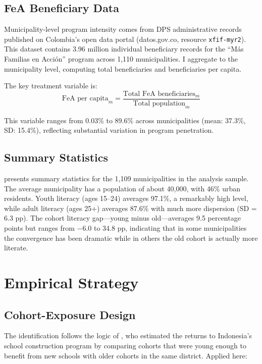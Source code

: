 \documentclass[12pt]{article}
\begin{document}
\subsection{FeA Beneficiary Data}

Municipality-level program intensity comes from DPS administrative records published on Colombia's open data portal (datos.gov.co, resource \texttt{xfif-myr2}). This dataset contains 3.96 million individual beneficiary records for the ``M\'{a}s Familias en Acci\'{o}n'' program across 1,110 municipalities. I aggregate to the municipality level, computing total beneficiaries and beneficiaries per capita.

The key treatment variable is:
\[
\text{FeA per capita}_m = \frac{\text{Total FeA beneficiaries}_m}{\text{Total population}_m}
\]

This variable ranges from 0.03\% to 89.6\% across municipalities (mean: 37.3\%, SD: 15.4\%), reflecting substantial variation in program penetration.

\subsection{Summary Statistics}



 presents summary statistics for the 1,109 municipalities in the analysis sample. The average municipality has a population of about 40,000, with 46\% urban residents. Youth literacy (ages 15--24) averages 97.1\%, a remarkably high level, while adult literacy (ages 25+) averages 87.6\% with much more dispersion (SD = 6.3 pp). The cohort literacy gap---young minus old---averages 9.5 percentage points but ranges from $-6.0$ to 34.8 pp, indicating that in some municipalities the convergence has been dramatic while in others the old cohort is actually more literate.

\section{Empirical Strategy}
\label{sec:strategy}

\subsection{Cohort-Exposure Design}

The identification follows the logic of \citet{duflo2001schooling}, who estimated the returns to Indonesia's school construction program by comparing cohorts that were young enough to benefit from new schools with older cohorts in the same district. Applied here:
\end{document}
